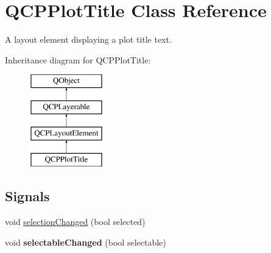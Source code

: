 \hypertarget{class_q_c_p_plot_title}{}\section{Q\+C\+P\+Plot\+Title Class Reference}
\label{class_q_c_p_plot_title}


A layout element displaying a plot title text.  


Inheritance diagram for Q\+C\+P\+Plot\+Title\+:\begin{figure}[H]
\begin{center}
\leavevmode
\includegraphics[height=4.000000cm]{class_q_c_p_plot_title}
\end{center}
\end{figure}
\subsection*{Signals}
\begin{DoxyCompactItemize}
\item 
void \hyperlink{class_q_c_p_plot_title_a3a01ede2da3b0b5eda33aa5274cc3523}{selection\+Changed} (bool selected)
\item 
\hypertarget{class_q_c_p_plot_title_a5eac3c17a4dbabb75250bc1210a83cfc}{}\label{class_q_c_p_plot_title_a5eac3c17a4dbabb75250bc1210a83cfc} 
void {\bfseries selectable\+Changed} (bool selectable)
\end{DoxyCompactItemize}
